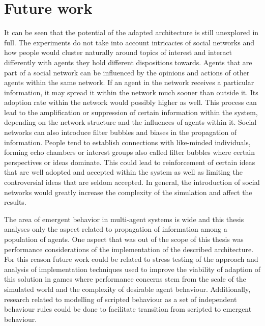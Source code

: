 \section{Future work}


It can be seen that the potential of the adapted architecture is still unexplored in full.
The experiments do not take into account intricacies of social networks and how people would cluster naturally around topics of interest and interact differently with agents they hold different dispositions towards.
Agents that are part of a social network can be influenced by the opinions and actions of other agents within the same network.
If an agent in the network receives a particular information, it may spread it within the network much sooner than outside it.
Its adoption rate within the network would possibly higher as well.
This process can lead to the amplification or suppression of certain information within the system, depending on the network structure and the influences of agents within it.
Social networks can also introduce filter bubbles and biases in the propagation of information.
People tend to establish connections with like-minded individuals, forming echo chambers or interest groups also called filter bubbles where certain perspectives or ideas dominate.
This could lead to reinforcement of certain ideas that are well adopted and accepted within the system as well as limiting the controversial ideas that are seldom accepted.
In general, the introduction of social networks would greatly increase the complexity of the simulation and affect the results.

The area of emergent behavior in multi-agent systems is wide and this thesis analyses only the aspect related to propagation of information among a population of agents.
One aspect that was out of the scope of this thesis was performance considerations of the implementation of the described architecture.
For this reason future work could be related to stress testing of the approach and analysis of implementation techniques used to improve the viability of adaption of this solution in games where performance concerns stem from the scale of the simulated world and the complexity of desirable agent behaviour.
Additionally, research related to modelling of scripted behaviour as a set of independent behaviour rules could be done to facilitate transition from scripted to emergent behaviour.

